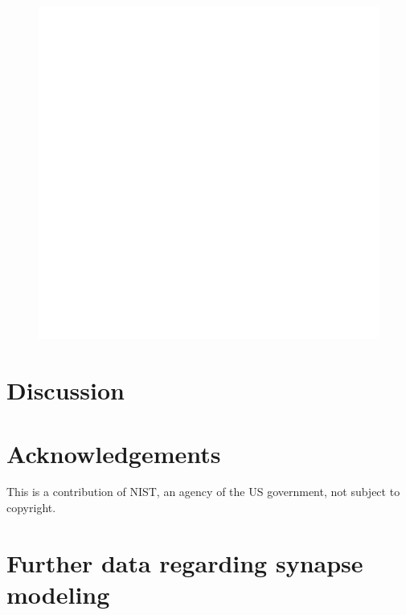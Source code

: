 \documentclass[twocolumn]{article}
\begin{document}
\begin{figure}[h!]
\includegraphics[width=17.2cm]{figures/_fig__point_neuron__nine_synapses__data.pdf}
\end{figure}

\section{\label{sec:discussion}Discussion}

\vspace{1em}
\section{\label{sec:acknowledgements}Acknowledgements}
\noindent This is a contribution of NIST, an agency of the US government, not subject to copyright.

\appendix

\section{\label{apx:synapses}Further data regarding synapse modeling}
\end{document}
